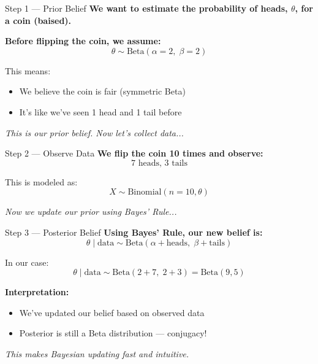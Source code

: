 \documentclass[handout,aspectratio=169]{beamer}
\begin{document}
\begin{frame}{Step 1 — Prior Belief}
  \textbf{We want to estimate the probability of heads, $\theta$, for a coin (baised).}

  \vspace{1em}
  \textbf{Before flipping the coin, we assume:}
  \[
    \theta \sim \text{Beta}(\alpha = 2,\; \beta = 2)
  \]

  \vspace{0.5em}
  This means:
  \begin{itemize}
    \item We believe the coin is fair (symmetric Beta)
    \item It’s like we've seen 1 head and 1 tail before
  \end{itemize}

  \vspace{1em}
  \textit{This is our prior belief. Now let’s collect data...}
\end{frame}

\begin{frame}{Step 2 — Observe Data}
  \textbf{We flip the coin 10 times and observe:}
  \[
    7 \text{ heads, } 3 \text{ tails}
  \]

  \vspace{1em}
  This is modeled as:
  \[
    X \sim \text{Binomial}(n = 10, \theta)
  \]

  \vspace{1em}
  \textit{Now we update our prior using Bayes' Rule...}
\end{frame}

\begin{frame}{Step 3 — Posterior Belief}
  \textbf{Using Bayes' Rule, our new belief is:}
  \[
    \theta \mid \text{data} \sim \text{Beta}(\alpha + \text{heads},\; \beta + \text{tails})
  \]

  \vspace{1em}
  In our case:
  \[
    \theta \mid \text{data} \sim \text{Beta}(2 + 7,\; 2 + 3) = \text{Beta}(9, 5)
  \]

  \vspace{1em}
  \textbf{Interpretation:}
  \begin{itemize}
    \item We've updated our belief based on observed data
    \item Posterior is still a Beta distribution — conjugacy!
  \end{itemize}

  \vspace{1em}
  \textit{This makes Bayesian updating fast and intuitive.}
\end{frame}
\end{document}
